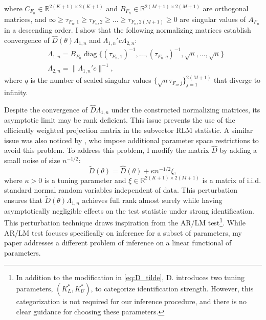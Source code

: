 \documentclass[11pt]{article}
\theoremstyle{definition}
\DeclareMathOperator*{\diag}{diag}
\newcommand{\R}{\ensuremath{\mathbb{R}}}
\newcommand{\0}{\ensuremath{\mathbf{0}}}
\begin{document}
\begin{bibunit}
\[\]
where $C_{F_n} \in \R^{2(K+1)\times 2(K+1)}$ and $B_{F_n} \in \R^{2(M+1)\times 2(M+1)}$ are orthogonal matrices, and $\infty \geq \tau_{F_n,1} \geq \tau_{F_n,2} \geq  \ldots \geq \tau_{F_n,2(M+1)} \geq 0$ are singular values of $A_{F_n}$ in a descending order. I show that the following normalizing matrices establish convergence of $\hat{D}(\theta)\Lambda_{1,n}$ and $\Lambda_{1,n}'c\Lambda_{2,n}$:
\begin{align*}
	&\Lambda_{1,n} = B_{F_n} \diag\{(\tau_{F_n,1})^{-1},\ldots, (\tau_{F_n,q})^{-1}, \sqrt{n},\ldots, \sqrt{n}\} \\
	&\Lambda_{2,n} = \|\Lambda_{1,n}'c\|^{-1},
\end{align*}
where $q$ is the number of scaled singular values $\{\sqrt{n}\tau_{F_n,j}\}_{j=1}^{2(M+1)}$ that diverge to infinity.

Despite the convergence of $\hat{D}\Lambda_{1,n}$ under the constructed normalizing matrices, its asymptotic limit may be rank deficient. This issue prevents the use of the efficiently weighted projection matrix in the subvector RLM statistic. A similar issue was also noticed by \cite{andrews/guggenberger:2017}, who impose additional parameter space restrictions to avoid this problem.  To address this problem, I modify the matrix $\hat{D}$ by adding a small noise of size $n^{-1/2}$:
\begin{equation}
\label{eq:D_tilde}
	\widetilde{D}(\theta) = \hat{D}(\theta) + \kappa n^{-1/2}\xi,
\end{equation}
where $\kappa > 0$ is a tuning parameter and $\xi \in \R^{2(K+1)\times 2(M+1)}$ is a matrix of i.i.d. standard normal random variables independent of data. This perturbation ensures that $\widetilde{D}(\theta)\Lambda_{1,n}$ achieves full rank almost surely while having asymptotically negligible effects on the test statistic under strong identification.
This perturbation technique draws inspiration from the AR/LM test\footnote{In addition to the modification in \eqref{eq:D_tilde}, D. \citet[eq. (7.11)]{andrews.d:2017} introduces two tuning parameters, $(K_L^*, K_U^*)$, to categorize identification strength. However, this categorization is not required for our inference procedure, and there is no clear guidance for choosing these parameters.}\citep{andrews.d:2017}. While AR/LM test focuses specifically on inference for a subset of parameters, my paper addresses a different problem of inference on a linear functional of parameters.

%
%
%
%
%


\end{bibunit}
\end{document}
